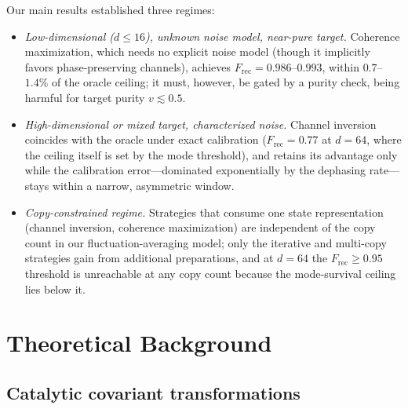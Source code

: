 \documentclass[12pt,a4paper]{article}
\newcommand{\Frec}{F_\mathrm{rec}}
\begin{document}
Our main results established three regimes:
\begin{itemize}
\item \emph{Low-dimensional ($d \leq 16$), unknown noise model, near-pure target.} Coherence maximization, which needs no explicit noise model (though it implicitly favors phase-preserving channels), achieves $\Frec = 0.986$--$0.993$, within $0.7$--$1.4\%$ of the oracle ceiling; it must, however, be gated by a purity check, being harmful for target purity $v \lesssim 0.5$.
\item \emph{High-dimensional or mixed target, characterized noise.} Channel inversion coincides with the oracle under exact calibration ($\Frec = 0.77$ at $d = 64$, where the ceiling itself is set by the mode threshold), and retains its advantage only while the calibration error---dominated exponentially by the dephasing rate---stays within a narrow, asymmetric window.
\item \emph{Copy-constrained regime.} Strategies that consume one state representation (channel inversion, coherence maximization) are independent of the copy count in our fluctuation-averaging model; only the iterative and multi-copy strategies gain from additional preparations, and at $d = 64$ the $\Frec \geq 0.95$ threshold is unreachable at any copy count because the mode-survival ceiling lies below it.
\end{itemize}


\section{Theoretical Background}
\label{sec:theory}

\subsection{Catalytic covariant transformations}
\label{sec:catalytic}
\end{document}
